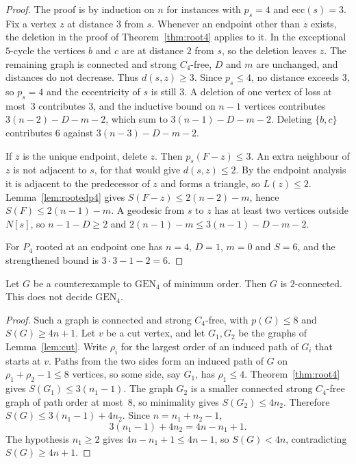 \documentclass[ASNA]{USG}
\theoremstyle{WBstyletwo}
\numberwithin{equation}{section}
\newcommand{\pp}{p}
\newcommand{\GEN}{\mathrm{GEN}}
\begin{document}
\begin{proof}
The proof is by induction on $n$ for instances with $\pp_s=4$ and $\mathrm{ecc}(s)=3$. Fix a vertex $z$ at distance $3$ from $s$. Whenever an endpoint other than $z$ exists, the deletion in the proof of Theorem~\ref{thm:root4} applies to it. In the exceptional $5$-cycle the vertices $b$ and $c$ are at distance $2$ from $s$, so the deletion leaves $z$. The remaining graph is connected and strong $C_4$-free, $D$ and $m$ are unchanged, and distances do not decrease. Thus $d(s,z)\ge 3$. Since $\pp_s\le 4$, no distance exceeds $3$, so $\pp_s=4$ and the eccentricity of $s$ is still $3$. A deletion of one vertex of loss at most~$3$ contributes $3$, and the inductive bound on $n-1$ vertices contributes $3(n-2)-D-m-2$, which sum to $3(n-1)-D-m-2$. Deleting $\{b,c\}$ contributes $6$ against $3(n-3)-D-m-2$.

If $z$ is the unique endpoint, delete $z$. Then $\pp_s(F-z)\le 3$. An extra neighbour of $z$ is not adjacent to $s$, for that would give $d(s,z)\le 2$. By the endpoint analysis it is adjacent to the predecessor of $z$ and forms a triangle, so $L(z)\le 2$. Lemma~\ref{lem:rootedp4} gives $S(F-z)\le 2(n-2)-m$, hence $S(F)\le 2(n-1)-m$. A geodesic from $s$ to $z$ has at least two vertices outside $N[s]$, so $n-1-D\ge 2$ and $2(n-1)-m\le 3(n-1)-D-m-2$.

For $P_4$ rooted at an endpoint one has $n=4$, $D=1$, $m=0$ and $S=6$, and the strengthened bound is $3\cdot 3-1-2=6$.
\end{proof}

\begin{proposition}\label{prop:gen4cut}
Let $G$ be a counterexample to $\GEN_4$ of minimum order. Then $G$ is $2$-connected. This does not decide $\GEN_4$.
\end{proposition}

\begin{proof}
Such a graph is connected and strong $C_4$-free, with $\pp(G)\le 8$ and $S(G)\ge 4n+1$. Let $v$ be a cut vertex, and let $G_1,G_2$ be the graphs of Lemma~\ref{lem:cut}. Write $\rho_i$ for the largest order of an induced path of $G_i$ that starts at $v$. Paths from the two sides form an induced path of $G$ on $\rho_1+\rho_2-1\le 8$ vertices, so some side, say $G_1$, has $\rho_1\le 4$. Theorem~\ref{thm:root4} gives $S(G_1)\le 3(n_1-1)$. The graph $G_2$ is a smaller connected strong $C_4$-free graph of path order at most~$8$, so minimality gives $S(G_2)\le 4n_2$. Therefore $S(G)\le 3(n_1-1)+4n_2$. Since $n=n_1+n_2-1$,
\[
3(n_1-1)+4n_2=4n-n_1+1.
\]
The hypothesis $n_1\ge 2$ gives $4n-n_1+1\le 4n-1$, so $S(G)<4n$, contradicting $S(G)\ge 4n+1$.
\end{proof}
\end{document}
